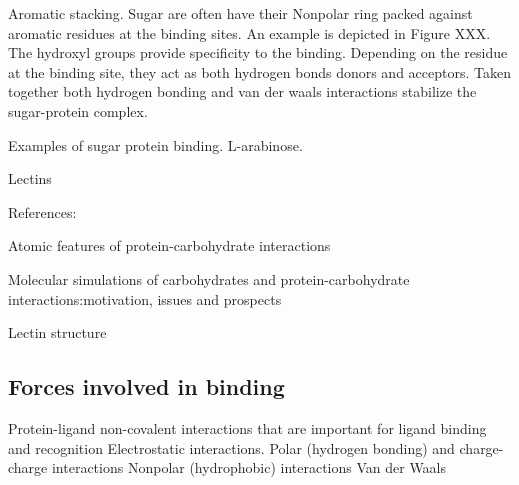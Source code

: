 Aromatic stacking. Sugar are often have their Nonpolar ring packed against aromatic residues at the binding sites.  An example is depicted in Figure XXX.  The hydroxyl groups provide specificity to the binding.  Depending on the residue at the binding site, they act as both hydrogen bonds donors and acceptors. Taken together both hydrogen bonding and van der waals interactions stabilize the sugar-protein complex.

Examples of sugar protein binding.  L-arabinose.

Lectins

References:

Atomic features of protein-carbohydrate interactions\cite{Vyas:1991p6498}

Molecular simulations of carbohydrates and protein-carbohydrate interactions:motivation, issues and prospects\cite{Fadda:2010p5889}

Lectin structure\cite{Rini:1995p2497}

\subsection{Forces involved in binding}
\begin{outline}
	\1 Protein-ligand non-covalent interactions that are important for ligand binding and recognition
		\2 Electrostatic interactions. Polar (hydrogen bonding) and charge-charge interactions
		\2 Nonpolar (hydrophobic) interactions
		  \3 Van der Waals
\end{outline}


